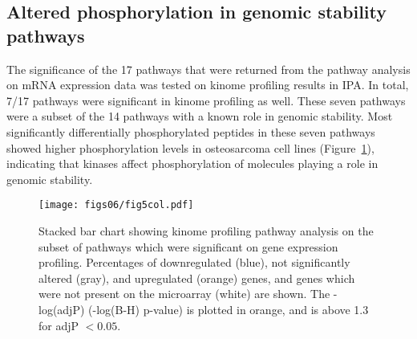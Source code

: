 \subsection{Altered phosphorylation in genomic stability pathways}
The significance of the 17 pathways that were returned from the pathway analysis on mRNA expression data was tested on kinome profiling results in IPA. In total, 7/17 pathways were significant in kinome profiling as well. These seven pathways were a subset of the 14 pathways with a known role in genomic stability. Most significantly differentially phosphorylated peptides in these seven pathways showed higher phosphorylation levels in osteosarcoma cell lines (Figure~\ref{fig6.5}), indicating that kinases affect phosphorylation of molecules playing a role in genomic stability.
%
\begin{figure}[htbp]
	\centering
	\texttt{[image: figs06/fig5col.pdf]}	%
	\caption{Stacked bar chart showing kinome profiling pathway analysis on the subset of pathways which were significant on gene expression profiling. Percentages of downregulated (blue), not significantly altered (gray), and upregulated (orange) genes, and genes which were not present on the microarray (white) are shown. The -log(adjP) (-log(B-H) p-value) is plotted in orange, and is above 1.3 for adjP $<0.05$.}			%
	\label{fig6.5}
\end{figure}
%

